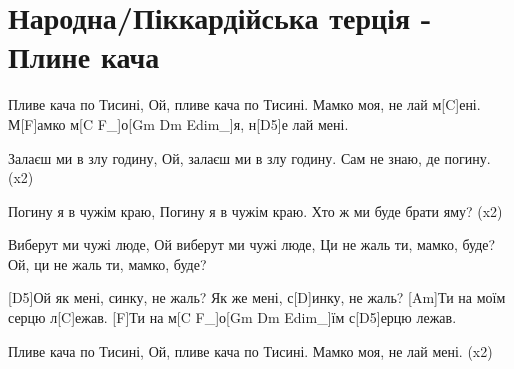 \section{Народна/Піккардійська терція - Плине кача}
\begin{guitar}
[D5] Пливе кача по Тисині,
Ой, пливе кача по Тисині.
Мамко моя, не лай м[C]ені.
М[F]амко м[C F_]о[Gm Dm Edim_]я, н[D5]е лай мені.

Залаєш ми в злу годину,
Ой, залаєш ми в злу годину.
Сам не знаю, де погину.   (x2)

Погину я в чужім краю,
Погину я в чужім краю.
Хто ж ми буде брати яму?  (x2)

Виберут ми чужі люде,
Ой виберут ми чужі люде,
Ци не жаль ти, мамко, буде?
Ой, ци не жаль ти, мамко, буде?

[D5]Ой як мені, синку, не жаль?
Як же мені, с[D]инку, не жаль?
[Am]Ти на моїм серцю л[C]ежав.
[F]Ти на м[C F_]о[Gm Dm Edim_]їм с[D5]ерцю лежав.

Пливе кача по Тисині,
Ой, пливе кача по Тисині.
Мамко моя, не лай мені.   (x2)
\end{guitar}
